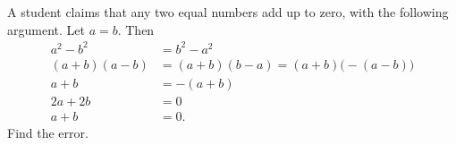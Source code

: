 A student claims that any two equal numbers add up to zero, with the following argument. Let $a=b$. Then
\begin{align*}
a^2-b^2&=b^2-a^2\\
(a+b)(a-b)&=(a+b)(b-a)=(a+b)\bigl(-(a-b)\bigr)\\
a+b&=-(a+b)\\
2a+2b&=0\\
a+b&=0.
\end{align*}
Find the error.

